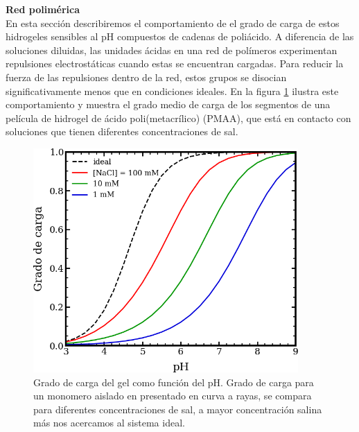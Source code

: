 \textbf{Red polim\'erica} \\
En esta secci\'on describiremos el comportamiento de el grado de  carga de estos  hidrogeles sensibles al pH compuestos de cadenas de poli\'acido. A diferencia de las soluciones diluidas, las unidades \'acidas en una red de pol\'imeros experimentan repulsiones electrost\'aticas cuando estas se encuentran cargadas. Para reducir la fuerza de las repulsiones dentro de la red, estos grupos se disocian significativamente menos que en condiciones ideales.
En la figura \ref{fig:degree-film} ilustra este comportamiento y muestra el grado medio de carga de los segmentos de una pel\'icula de hidrogel de \'acido poli(metacr\'ilico) (PMAA), que est\'a en contacto con soluciones que tienen diferentes concentraciones de sal.
\begin{figure}
    \centering
    \includegraphics[width=0.9\textwidth]{Figures/graph-film/charge_degree-film.png}
    \caption{Grado de carga del gel como funci\'on del pH. Grado de carga para un monomero aislado en presentado en curva a rayas, se compara para diferentes concentraciones de sal, a mayor concentraci\'on salina m\'as nos acercamos al sistema ideal.}
    \label{fig:degree-film}
\end{figure}




